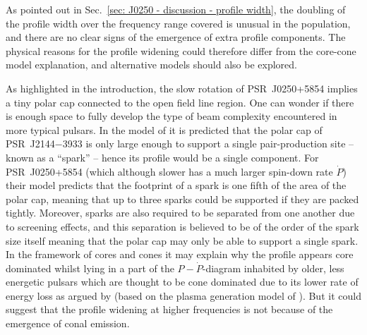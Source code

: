 As pointed out in Sec.~\ref{sec: J0250 - discussion - profile width}, the doubling of the profile width over the frequency range covered is unusual in the population, and there are no clear signs of the emergence of extra profile components. The physical reasons for the profile widening could therefore differ from the core-cone model explanation, and alternative models should also be explored.

As highlighted in the introduction, the slow rotation of PSR~J0250+5854 implies a tiny polar cap connected to the open field line region. One can wonder if there is enough space to fully develop the type of beam complexity encountered in more typical pulsars. In the model of \citet{MBMA2020} it is predicted that the polar cap of PSR~J2144$-$3933 is only large enough to support a single pair-production site -- known as a ``spark'' -- hence its profile would be a single component. For PSR~J0250+5854 (which although slower has a much larger spin-down rate $\dot{P}$) their model predicts that the footprint of a spark is one fifth of the area of the polar cap, meaning that up to three sparks could be supported if they are packed tightly. Moreover, sparks are also required to be separated from one another due to screening effects, and this separation is believed to be of the order of the spark size itself \citep[e.g.][]{GSxx2000} meaning that the polar cap may only be able to support a single spark. In the framework of cores and cones it may explain why the profile appears core dominated whilst lying in a part of the $P-\dot{P}$-diagram inhabited by older, less energetic pulsars which are thought to be cone dominated due to its lower rate of energy loss as argued by \citet{ROWx2020} (based on the plasma generation model of \citealt{THxx2015}). But it could suggest that the profile widening at higher frequencies is not because of the emergence of conal emission.


